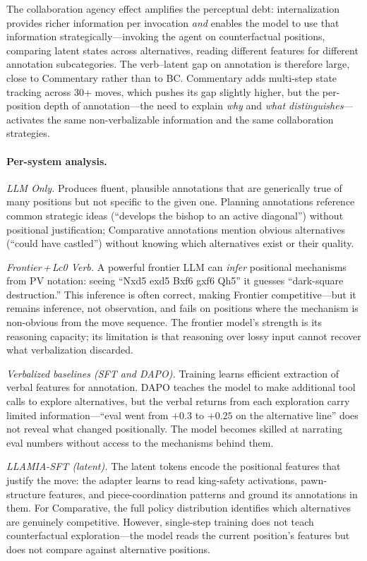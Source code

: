 The collaboration agency effect amplifies the perceptual debt: internalization
provides richer information per invocation \emph{and} enables the model to
use that information strategically---invoking the agent on counterfactual
positions, comparing latent states across alternatives, reading different
features for different annotation subcategories.
The verb--latent gap on annotation is therefore large, close to Commentary
rather than to BC\@.
Commentary adds multi-step state tracking across 30+ moves, which pushes
its gap slightly higher, but the per-position depth of annotation---the
need to explain \emph{why} and \emph{what distinguishes}---activates the
same non-verbalizable information and the same collaboration strategies.

\paragraph{Per-system analysis.}

\emph{LLM Only.}
Produces fluent, plausible annotations that are generically true of many
positions but not specific to the given one.
Planning annotations reference common strategic ideas (``develops the bishop
to an active diagonal'') without positional justification; Comparative
annotations mention obvious alternatives (``could have castled'') without
knowing which alternatives exist or their quality.

\emph{Frontier\,+\,Lc0 Verb.}
A powerful frontier LLM can \emph{infer} positional mechanisms from PV
notation: seeing ``Nxd5 exd5 Bxf6 gxf6 Qh5'' it guesses ``dark-square
destruction.''
This inference is often correct, making Frontier competitive---but it
remains inference, not observation, and fails on positions where the
mechanism is non-obvious from the move sequence.
The frontier model's strength is its reasoning capacity; its limitation is
that reasoning over lossy input cannot recover what verbalization discarded.

\emph{Verbalized baselines (SFT and DAPO).}
Training learns efficient extraction of verbal features for annotation.
DAPO teaches the model to make additional tool calls to explore
alternatives, but the verbal returns from each exploration carry limited
information---``eval went from $+0.3$ to $+0.25$ on the alternative line''
does not reveal what changed positionally.
The model becomes skilled at narrating eval numbers without access to the
mechanisms behind them.

\emph{LLAMIA-SFT (latent).}
The latent tokens encode the positional features that justify the move:
the adapter learns to read king-safety activations, pawn-structure
features, and piece-coordination patterns and ground its annotations in
them.
For Comparative, the full policy distribution identifies which alternatives
are genuinely competitive.
However, single-step training does not teach counterfactual exploration---the
model reads the current position's features but does not compare against
alternative positions.

